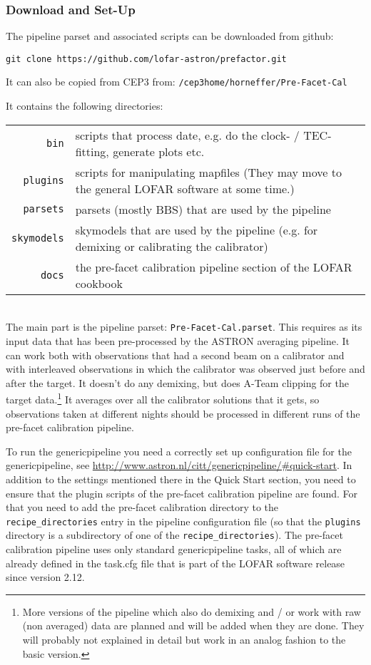 \subsubsection{Download and Set-Up}

The pipeline parset and associated scripts can be downloaded from github: 
\begin{verbatim}
git clone https://github.com/lofar-astron/prefactor.git
\end{verbatim}
It can also be copied from CEP3 from: {\tt /cep3home/horneffer/Pre-Facet-Cal}

It contains the following directories: \\
\begin{tabular}{rp{}}
{\tt bin} & scripts that process date, e.g. do the clock- / TEC- fitting, generate plots etc.\\
{\tt plugins} & scripts for manipulating mapfiles (They may move to the general LOFAR software at some time.)\\
{\tt parsets} & parsets (mostly BBS) that are used by the pipeline\\
{\tt skymodels} & skymodels that are used by the pipeline (e.g. for demixing or calibrating the calibrator)\\
{\tt docs} & the pre-facet calibration pipeline section of the LOFAR cookbook\\
\end{tabular}\\
The main part is the pipeline parset: {\tt Pre-Facet-Cal.parset}. This requires as its input data that has 
been pre-processed by the ASTRON averaging pipeline.
It can work both with observations that had a second beam on a calibrator and with interleaved observations in 
which the calibrator was observed just before and after the target. It doesn't do any demixing, but does
A-Team clipping for the target data.\footnote{More versions of the pipeline which also do demixing and / or work 
with raw (non averaged) data are planned and will be added when they are done. They will probably not explained in 
detail but work in an analog fashion to the basic version.}
It averages over all the calibrator solutions that it gets, so observations taken at different nights should
be processed in different runs of the pre-facet calibration pipeline. 

To run the genericpipeline you need a correctly set up configuration file for the genericpipeline,
see \url{http://www.astron.nl/citt/genericpipeline/#quick-start}.
In addition to the settings mentioned there in the Quick Start section, you need to ensure that the 
plugin scripts of the pre-facet calibration pipeline are found. For that you need to add the pre-facet 
calibration directory to the {\tt recipe\_directories} entry in the pipeline configuration file 
(so that the {\tt plugins} directory is a subdirectory of one of the {\tt recipe\_directories}).
The pre-facet calibration pipeline uses only standard genericpipeline tasks, all of which are already defined 
in the task.cfg file that is part of the LOFAR software release since version 2.12.


